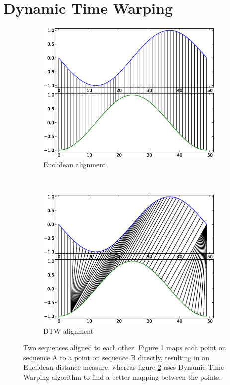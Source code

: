 \documentclass[parskip]{cs4rep}
\begin{document}
\section{Dynamic Time Warping}
\label{sec:DTW}

\begin{figure}[b,t]
   \centering
   \begin{subfigure}[b]{0.45\textwidth}
       \centering
       \includegraphics[width=\textwidth]{figures/DTW/sin-cos-no-dtw.eps}
       \caption{Euclidean alignment}
       \label{fig:DTW:euclidean_alignment}
   \end{subfigure}
   ~
   \begin{subfigure}[b]{0.45\textwidth}
       \centering
       \includegraphics[width=\textwidth]{figures/DTW/sin-cos-dtw.eps}
       \caption{DTW alignment}
       \label{fig:DTW:dtw_alignment}
   \end{subfigure}
   
   \caption{Two sequences aligned to each other. Figure \ref{fig:DTW:euclidean_alignment} maps each point on sequence A to a point on sequence B directly, resulting in an Euclidean distance measure, whereas figure \ref{fig:DTW:dtw_alignment} uses Dynamic Time Warping algorithm to find a better mapping between the points.}
   \label{fig:DTW:alignments}
\end{figure}
\end{document}
